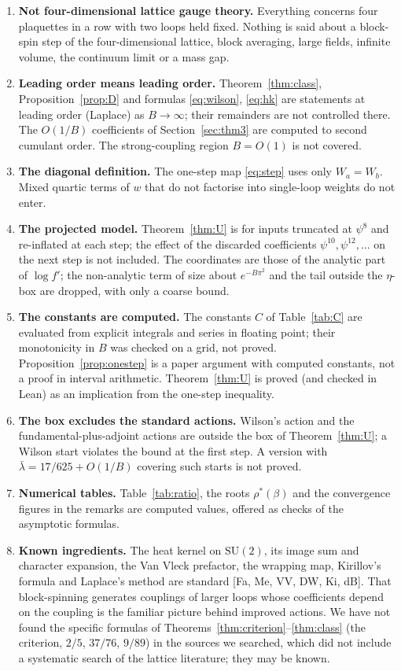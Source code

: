 \documentclass[11pt,a4paper]{article}
\theoremstyle{definition}
\theoremstyle{remark}
\newcommand{\SU}{\mathrm{SU}(2)}
\begin{document}
\begin{enumerate}[label=\arabic*.]
\item \textbf{Not four-dimensional lattice gauge theory.} Everything concerns four plaquettes in a row with two loops held fixed. Nothing is said about a block-spin step of the four-dimensional lattice, block averaging, large fields, infinite volume, the continuum limit or a mass gap.
\item \textbf{Leading order means leading order.} Theorem~\ref{thm:class}, Proposition~\ref{prop:D} and formulas \eqref{eq:wilson}, \eqref{eq:hk} are statements at leading order (Laplace) as $B\to\infty$; their remainders are not controlled there. The $O(1/B)$ coefficients of Section~\ref{sec:thm3} are computed to second cumulant order. The strong-coupling region $B=O(1)$ is not covered.
\item \textbf{The diagonal definition.} The one-step map \eqref{eq:step} uses only $W_a=W_b$. Mixed quartic terms of $w$ that do not factorise into single-loop weights do not enter.
\item \textbf{The projected model.} Theorem~\ref{thm:U} is for inputs truncated at $\psi^8$ and re-inflated at each step; the effect of the discarded coefficients $\psi^{10},\psi^{12},\dots$ on the next step is not included. The coordinates are those of the analytic part of $\log f'$; the non-analytic term of size about $e^{-B\pi^2}$ and the tail outside the $\eta$-box are dropped, with only a coarse bound.
\item \textbf{The constants are computed.} The constants $C$ of Table~\ref{tab:C} are evaluated from explicit integrals and series in floating point; their monotonicity in $B$ was checked on a grid, not proved. Proposition~\ref{prop:onestep} is a paper argument with computed constants, not a proof in interval arithmetic. Theorem~\ref{thm:U} is proved (and checked in Lean) as an implication from the one-step inequality.
\item \textbf{The box excludes the standard actions.} Wilson's action and the fundamental-plus-adjoint actions are outside the box of Theorem~\ref{thm:U}; a Wilson start violates the bound at the first step. A version with $\bar\lambda=17/625+O(1/B)$ covering such starts is not proved.
\item \textbf{Numerical tables.} Table~\ref{tab:ratio}, the roots $\rho^*(\beta)$ and the convergence figures in the remarks are computed values, offered as checks of the asymptotic formulas.
\item \textbf{Known ingredients.} The heat kernel on $\SU$, its image sum and character expansion, the Van Vleck prefactor, the wrapping map, Kirillov's formula and Laplace's method are standard [Fa, Me, VV, DW, Ki, dB]. That block-spinning generates couplings of larger loops whose coefficients depend on the coupling is the familiar picture behind improved actions. We have not found the specific formulas of Theorems~\ref{thm:criterion}--\ref{thm:class} (the criterion, $2/5$, $37/76$, $9/89$) in the sources we searched, which did not include a systematic search of the lattice literature; they may be known.

\end{enumerate}
\end{document}
